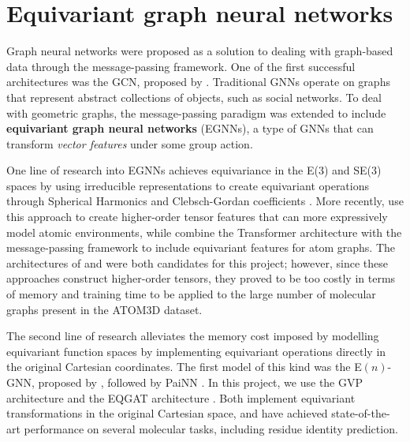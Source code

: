 \section{Equivariant graph neural networks}

Graph neural networks were proposed as a solution to dealing with graph-based data through the message-passing framework. One of the first successful architectures was the GCN, proposed by \citet{gcn}. 
Traditional GNNs operate on graphs that represent abstract collections of objects, such as social networks. To deal with geometric graphs, the message-passing paradigm was extended to include \textbf{equivariant graph neural networks} (EGNNs), a type of GNNs that can transform \textit{vector features} under some group action.

One line of research into EGNNs achieves equivariance in the E(3) and SE(3) spaces by using irreducible representations to create equivariant operations through Spherical Harmonics and Clebsch-Gordan coefficients \cite{thomas2018tensor, anderson2019cormorant, batatia2022design, fuchs2020se}. More recently, \citet{mace} use this approach to create higher-order tensor features that can more expressively model atomic environments, while \citet{liao2023equiformer} combine the Transformer architecture with the message-passing framework to include equivariant features for atom graphs. The architectures of \citet{mace} and \citet{liao2023equiformer} were both candidates for this project; however, since these approaches construct higher-order tensors, they proved to be too costly in terms of memory and training time to be applied to the large number of molecular graphs present in the ATOM3D dataset. 

The second line of research alleviates the memory cost imposed by modelling equivariant function spaces by implementing equivariant operations directly in the original Cartesian coordinates. The first model of this kind was the E$(n)$-GNN, proposed by \citet{satorras2021n}, followed by PaiNN \cite{schutt2021equivariant}. In this project, we use the GVP architecture \cite{gvp1, gvp2} and the EQGAT architecture \cite{eqgat, eqgat2}. Both implement equivariant transformations in the original Cartesian space, and have achieved state-of-the-art performance on several molecular tasks, including residue identity prediction.



